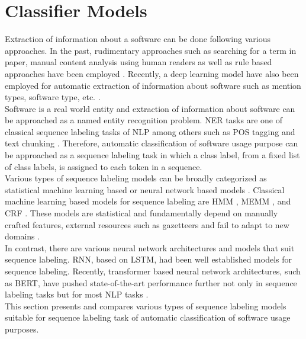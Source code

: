 \chapter{Classifier Models}
\label{ch:chapter04}
 
%
%

Extraction of information about a software can be done following various approaches. In the past, rudimentary approaches such as searching for a term in paper, manual content analysis using human readers as well as rule based approaches have been employed \citep{kruger2019literature}. Recently, a deep learning model have also been employed for automatic extraction of  information about software such as mention types, software type, etc. \citep{schindler2022role}.  \\

Software is a real world entity and extraction of information about software can be approached as a named entity recognition problem. \ac{NER} tasks are one of classical sequence labeling tasks of NLP among others such as \ac{POS} tagging and text chunking \citep{akhundov2018sequence, he2020survey}. Therefore, automatic classification of software usage purpose can be approached as a sequence labeling task in which a class label, from a fixed list of class labels, is assigned to each token in a sequence. \\

Various types of sequence labeling models can be broadly categorized as statistical machine learning based or neural network based models \citep{he2020survey}. Classical machine learning based models for sequence labeling are \ac{HMM} \citep{kupiec1992robust}, \ac{MEMM} \citep{mccallum2000maximum}, and \ac{CRF} \citep{lafferty2001conditional}. These models are statistical and fundamentally depend on manually crafted features, external resources such as gazetteers and fail to adapt to new domains \citep{ma2016end}.   \\

In contrast, there are various neural network architectures and models that suit sequence labeling. \ac{RNN}, based on \ac{LSTM}, had been well established models for sequence labeling. Recently, transformer based neural network architectures, such as  \ac{BERT}, have pushed state-of-the-art performance further not only in sequence labeling tasks but for most \ac{NLP} tasks \citep{vaswani2017attention}. \\

This section presents and compares various types of sequence labeling models suitable for sequence labeling task of automatic classification of software usage purposes. 

